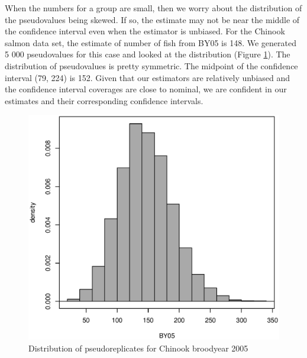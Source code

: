 \documentclass[%
                leqno,         %
%
]{nrc1}                          %
\begin{document}
When the numbers for a group are small, then we worry about the distribution of the pseudovalues being skewed. If so, the estimate may not be near the middle of the confidence interval even when the estimator is unbiased. For the Chinook salmon data set, the estimate of number of fish from BY05 is 148. We generated 5 000 pseudovalues for this case  and looked at the distribution (Figure \ref{fig:Figure1}). The distribution of pseudovalues is pretty symmetric. The midpoint of the confidence interval (79, 224) is 152. Given that our estimators are relatively unbiased and the confidence interval coverages are close to nominal, we are confident in our estimates and their corresponding confidence intervals.

\begin{figure}[htbp]
\centering
\includegraphics[width=\textwidth]{./Figure1}
\caption{Distribution of pseudoreplicates for Chinook broodyear 2005}
\label{fig:Figure1}
\end{figure}
\end{document}
